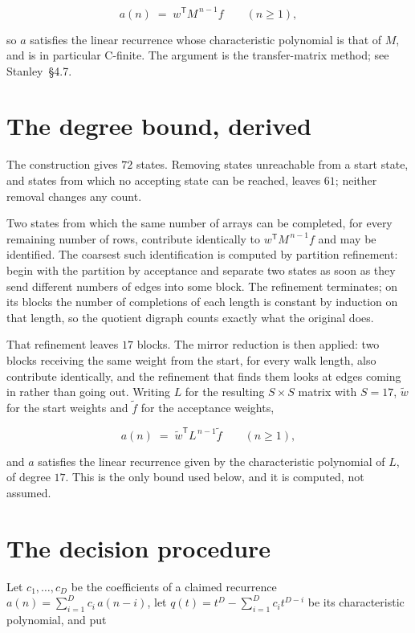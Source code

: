 \documentclass[11pt]{article}
\theoremstyle{definition}
\begin{document}
\[a(n) \;=\; w^{\mathsf T} M^{\,n-1} f \qquad (n \ge 1),\]

so $a$ satisfies the linear recurrence whose characteristic polynomial is that of $M$, and is in particular C-finite. The argument is the transfer-matrix method; see Stanley~\S4.7.

\section{The degree bound, derived}

The construction gives $72$ states. Removing states unreachable from a start state, and states from which no accepting state can be reached, leaves $61$; neither removal changes any count.

Two states from which the same number of arrays can be completed, for every remaining number of rows, contribute identically to $w^{\mathsf T}M^{\,n-1}f$ and may be identified. The coarsest such identification is computed by partition refinement: begin with the partition by acceptance and separate two states as soon as they send different numbers of edges into some block. The refinement terminates; on its blocks the number of completions of each length is constant by induction on that length, so the quotient digraph counts exactly what the original does.

That refinement leaves $17$ blocks. The mirror reduction is then applied: two blocks receiving the same weight from the start, for every walk length, also contribute identically, and the refinement that finds them looks at edges coming in rather than going out. Writing $L$ for the resulting $S \times S$ matrix with $S = 17$, $\tilde w$ for the start weights and $\tilde f$ for the acceptance weights,

\[a(n) \;=\; \tilde w^{\mathsf T} L^{\,n-1} \tilde f \qquad (n \ge 1),\]

and $a$ satisfies the linear recurrence given by the characteristic polynomial of $L$, of degree $17$. This is the only bound used below, and it is computed, not assumed.

\section{The decision procedure}

Let $c_1,\dots,c_D$ be the coefficients of a claimed recurrence $a(n) = \sum_{i=1}^{D} c_i\,a(n-i)$, let $q(t) = t^{D} - \sum_{i=1}^{D} c_i t^{D-i}$ be its characteristic polynomial, and put
\end{document}

